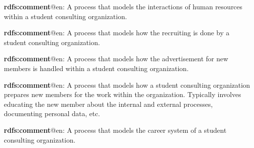 \documentclass[a4paper, DIV=13, BCOR=0cm]{scrbook}
\begin{document}
\begin{mdframed}[style=onto-1, frametitle={Human Resource Process}]
	{%
		\begin{compactitem}
			\item \textbf{rdfs:comment}@en: A process that models the interactions of human resources within a student consulting organization.
		\end{compactitem}
	} %
\end{mdframed}

\begin{mdframed}[style=onto-2, frametitle={Recruiting Process}]
	{%
		\begin{compactitem}
			\item \textbf{rdfs:comment}@en: A process that models how the recruiting is done by a student consulting organization.
		\end{compactitem}
	} %
\end{mdframed}

\begin{mdframed}[style=onto-3, frametitle={Advertising Process}]
	{%
		\begin{compactitem}
			\item \textbf{rdfs:comment}@en: A process that models how the advertisement for new members is handled within a student consulting organization.
		\end{compactitem}
	} %
\end{mdframed}

\begin{mdframed}[style=onto-2, frametitle={Onboarding Process}]
	{%
		\begin{compactitem}
			\item \textbf{rdfs:comment}@en: A process that models how a student consulting organization prepares new members for the work within the organization. Typically involves educating the new member about the internal and external processes, documenting personal data, etc.
		\end{compactitem}
	} %
\end{mdframed}

\begin{mdframed}[style=onto-2, frametitle={Career Process}]
	{%
		\begin{compactitem}
			\item \textbf{rdfs:comment}@en: A process that models the career system of a student consulting organization.
		\end{compactitem}
	} %
\end{mdframed}
\end{document}
